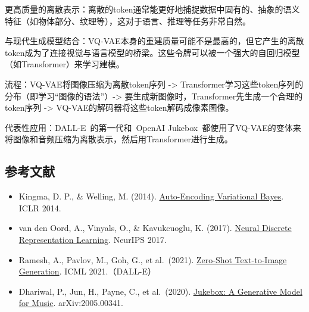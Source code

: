更高质量的离散表示：离散的token通常能更好地捕捉数据中固有的、抽象的语义特征（如物体部分、纹理等），这对于语言、推理等任务非常自然。

与现代生成模型结合：VQ-VAE本身的重建质量可能不是最高的，但它产生的离散token成为了连接视觉与语言模型的桥梁。这些令牌可以被一个强大的自回归模型（如Transformer）来学习建模。

流程：VQ-VAE将图像压缩为离散token序列 -\textgreater{} Transformer学习这些token序列的分布（即学习``图像的语法''）-\textgreater{} 要生成新图像时，Transformer先生成一个合理的token序列 -\textgreater{} VQ-VAE的解码器将这些token解码成像素图像。

代表性应用：DALL-E~的第一代和~OpenAI Jukebox~都使用了VQ-VAE的变体来将图像和音频压缩为离散表示，然后用Transformer进行生成。

\FloatBarrier
{}
\hypertarget{ux53c2ux8003ux6587ux732e-40}{%
\subsection{参考文献}\label{ux53c2ux8003ux6587ux732e-40}}

\vspace{0.25em}
\begin{itemize}
\tightlist
\item
  Kingma, D. P., \& Welling, M. (2014). \href{https://arxiv.org/abs/1312.6114}{Auto-Encoding Variational Bayes}. ICLR 2014.
\item
  van den Oord, A., Vinyals, O., \& Kavukcuoglu, K. (2017). \href{https://arxiv.org/abs/1711.00937}{Neural Discrete Representation Learning}. NeurIPS 2017.
\item
  Ramesh, A., Pavlov, M., Goh, G., et al.~(2021). \href{https://arxiv.org/abs/2102.12092}{Zero-Shot Text-to-Image Generation}. ICML 2021.（DALL-E）
\item
  Dhariwal, P., Jun, H., Payne, C., et al.~(2020). \href{https://arxiv.org/abs/2005.00341}{Jukebox: A Generative Model for Music}. arXiv:2005.00341.
\end{itemize}

\clearpage
